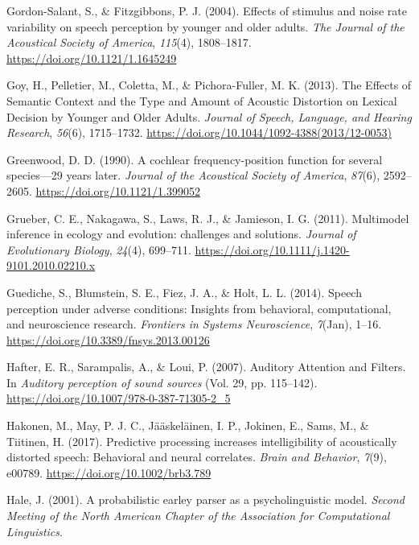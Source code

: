 \documentclass[a4paper, nobind]{templates/ociamthesis}
\newlength{\cslhangindent}
\newenvironment{CSLReferences}[2] %
 {%
  \setlength{\parindent}{0pt}
  \ifodd #1
  \let\oldpar\par
  \def\par{\hangindent=\cslhangindent\oldpar}
  \fi
  \setlength{\parskip}{1mm}
  \setlength{\baselineskip}{6mm}
 }%
 {}
\begin{document}
\begin{CSLReferences}{1}{0}
\leavevmode{}%
Gordon-Salant, S., \& Fitzgibbons, P. J. (2004). {Effects of stimulus and noise rate variability on speech perception by younger and older adults}. \emph{The Journal of the Acoustical Society of America}, \emph{115}(4), 1808--1817. \url{https://doi.org/10.1121/1.1645249}

\leavevmode{}%
Goy, H., Pelletier, M., Coletta, M., \& Pichora-Fuller, M. K. (2013). {The Effects of Semantic Context and the Type and Amount of Acoustic Distortion on Lexical Decision by Younger and Older Adults}. \emph{Journal of Speech, Language, and Hearing Research}, \emph{56}(6), 1715--1732. \url{https://doi.org/10.1044/1092-4388(2013/12-0053)}

\leavevmode{}%
Greenwood, D. D. (1990). {A cochlear frequency-position function for several species---29 years later}. \emph{Journal of the Acoustical Society of America}, \emph{87}(6), 2592--2605. \url{https://doi.org/10.1121/1.399052}

\leavevmode{}%
Grueber, C. E., Nakagawa, S., Laws, R. J., \& Jamieson, I. G. (2011). Multimodel inference in ecology and evolution: challenges and solutions. \emph{Journal of Evolutionary Biology}, \emph{24}(4), 699--711. \url{https://doi.org/10.1111/j.1420-9101.2010.02210.x}

\leavevmode{}%
Guediche, S., Blumstein, S. E., Fiez, J. A., \& Holt, L. L. (2014). {Speech perception under adverse conditions: Insights from behavioral, computational, and neuroscience research}. \emph{Frontiers in Systems Neuroscience}, \emph{7}(Jan), 1--16. \url{https://doi.org/10.3389/fnsys.2013.00126}

\leavevmode{}%
Hafter, E. R., Sarampalis, A., \& Loui, P. (2007). {Auditory Attention and Filters}. In \emph{Auditory perception of sound sources} (Vol. 29, pp. 115--142). \url{https://doi.org/10.1007/978-0-387-71305-2_5}

\leavevmode{}%
Hakonen, M., May, P. J. C., Jääskeläinen, I. P., Jokinen, E., Sams, M., \& Tiitinen, H. (2017). Predictive processing increases intelligibility of acoustically distorted speech: Behavioral and neural correlates. \emph{Brain and Behavior}, \emph{7}(9), e00789. \url{https://doi.org/10.1002/brb3.789}

\leavevmode{}%
Hale, J. (2001). A probabilistic earley parser as a psycholinguistic model. \emph{Second Meeting of the North American Chapter of the Association for Computational Linguistics}.


\end{CSLReferences}
\end{document}
